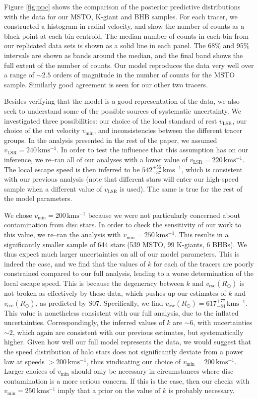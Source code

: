 \documentclass[useAMS,twocolumn,usenatbib]{mn2e}
\def\kms{{\,\mathrm{kms^{-1}}}}
\def\vesc{{v_\mathrm{esc}}}
\def\vmin{{v_\mathrm{min}}}
\begin{document}
Figure \ref{fig:ppc} shows the comparison of the posterior predictive distributions with the data for our MSTO, K-giant and BHB samples. 
For each tracer, we constructed a histogram in radial velocity, and show the number of counts as a black point at each bin centroid. 
The median number of counts in each bin from our replicated data sets is shown as a solid line in each panel.
The 68\% and 95\% intervals are shown as bands around the median, and the final band shows the full extent of the number of counts.  
Our model reproduces the data very well over a range of $\sim 2.5$ orders of magnitude in the number of counts for the MSTO sample. 
Similarly good agreement is seen for our other two tracers.

Besides verifying that the model is a good representation of the data, we also seek to understand some of the possible sources of systematic uncertainty.
We investigated three possibilities: our choice of the local standard of rest $v_\mathrm{LSR}$, our choice of the cut velocity $\vmin$, and inconsistencies between the different tracer groups.
In the analysis presented in the rest of the paper, we assumed $v_\mathrm{LSR} = 240\kms$. 
In order to test the influence that this assumption has on our inference, we re--ran all of our analyses with a lower value of $v_\mathrm{LSR} = 220\kms$.
The local escape speed is then inferred to be $542^{+56}_{-37}\kms$, which is consistent with our previous analysis (note that different stars will enter our high-speed sample when a different value of $v_\mathrm{LSR}$ is used). 
The same is true for the rest of the model parameters.

We chose $\vmin=200\kms$ because we were not particularly concerned about contamination from disc stars. 
In order to check the sensitivity of our work to this value, we re--ran the analysis with $\vmin = 250\kms$. 
This results in a significantly smaller sample of 644 stars (539 MSTO, 99 K-giants, 6 BHBs). 
We thus expect much larger uncertainties on all of our model parameters. 
This is indeed the case, and we find that the values of $k$ for each of the tracers are poorly constrained compared to our full analysis, leading to a worse determination of the local escape speed. 
This is because the degeneracy between $k$ and $\vesc(R_\odot)$ is not broken as effectively by these data, which pushes up our estimates of $k$ and $\vesc(R_\odot)$, as predicted by S07. 
Specifically, we find $\vesc(R_\odot) = 617^{+77}_{-84}\kms$.  
This value is nonetheless consistent with our full analysis, due to the inflated uncertainties. 
Correspondingly, the inferred values of $k$ are $\sim 6$, with uncertainties $\sim 2$, which again are consistent with our previous estimates, but systematically higher. 
Given how well our full model represents the data, we would suggest that the speed distribution of halo stars does not significantly deviate from a power law at speeds $>200\kms$, thus vindicating our choice of $\vmin = 200\kms$. 
Larger choices of $\vmin$ should only be necessary in circumstances where disc contamination is a more serious concern. 
If this is the case, then our checks with $\vmin = 250\kms$ imply that a prior on the value of $k$ is probably necessary.
\end{document}
